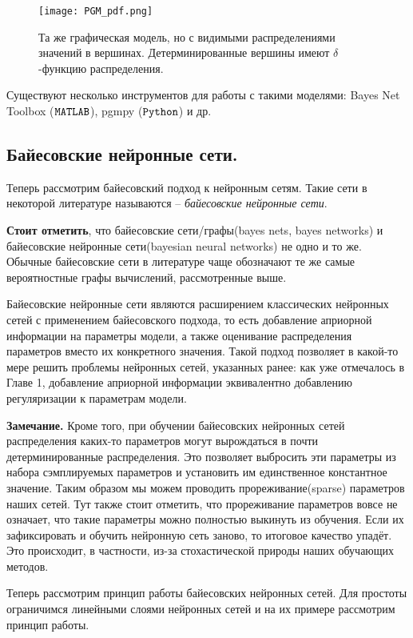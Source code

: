 \begin{figure}[H]
    \centering
    \texttt{[image: PGM\_pdf.png]}
    \caption{Та же графическая модель, но с видимыми распределениями значений в вершинах. Детерминированные вершины имеют $\delta$-функцию распределения.}
    \label{fig:PGM_pdf}
\end{figure}

Существуют несколько инструментов для работы с такими моделями: Bayes Net Toolbox ($\verb|MATLAB|$), pgmpy ($\verb|Python|$) и др.

\subsection{Байесовские нейронные сети.}

Теперь рассмотрим байесовский подход к нейронным сетям. Такие сети в некоторой литературе называются -- \textit{байесовские нейронные сети}.

\textbf{Стоит отметить}, что байесовские сети/графы(bayes nets, bayes networks) и байесовские нейронные сети(bayesian neural networks) не одно и то же.
Обычные байесовские сети в литературе чаще обозначают те же самые вероятностные графы вычислений, рассмотренные выше.

Байесовские нейронные сети\cite{weightuncertnn} являются расширением классических нейронных сетей с применением байесовского подхода, то есть
 добавление априорной информации на параметры модели, а также оценивание распределения параметров вместо их конкретного значения. Такой подход позволяет
 в какой-то мере решить проблемы нейронных сетей, указанных ранее: как уже отмечалось в Главе 1, добавление априорной информации эквивалентно
 добавлению регуляризации к параметрам модели.

\textbf{Замечание.} Кроме того, при обучении байесовских нейронных сетей распределения каких-то параметров могут вырождаться в почти детерминированные распределения.
 Это позволяет выбросить эти параметры из набора сэмплируемых параметров и установить им единственное константное значение.
 Таким образом мы можем проводить прореживание(sparse) параметров наших сетей. Тут
 также стоит отметить, что прореживание параметров вовсе не означает, что такие параметры можно полностью выкинуть из обучения. Если
 их зафиксировать и обучить нейронную сеть заново, то итоговое качество упадёт. Это происходит, в частности, из-за стохастической природы наших обучающих методов.

Теперь рассмотрим принцип работы байесовских нейронных сетей. Для простоты ограничимся линейными слоями нейронных сетей и на их примере рассмотрим принцип работы.

